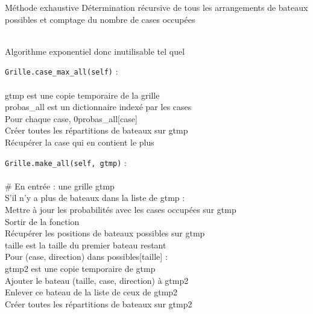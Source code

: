 \begin{frame}{Méthode exhaustive}
Détermination récursive de tous les arrangements de bateaux possibles et comptage du nombre de cases occupées \\~\\  \pause

Algorithme exponentiel donc inutilisable tel quel


\end{frame}

{
\begin{frame}[allowframebreaks]
\texttt{Grille.case\_max\_all(self)} :\\~\\

gtmp est une copie temporaire de la grille\\
probas\_all est un dictionnaire indexé par les cases\\
Pour chaque case, 0\sto probas\_all[case]\\
Créer toutes les répartitions de bateaux sur gtmp\\
Récupérer la case qui en contient le plus\\ 
\end{frame}
}

{
\begin{frame}[allowframebreaks]
\texttt{Grille.make\_all(self, gtmp)} :\\~\\

\# En entrée : une grille gtmp\\
S'il n'y a plus de bateaux dans la liste de gtmp :\\
Mettre à jour les probabilités avec les cases occupées sur gtmp\\
Sortir de la fonction\\
Récupérer les positions de bateaux possibles sur gtmp\\
taille est la taille du premier bateau restant\\
Pour (case, direction) dans possibles[taille] :\\
gtmp2 est une copie temporaire de gtmp\\
Ajouter le bateau (taille, case, direction) à gtmp2\\
Enlever ce bateau de la liste de ceux de gtmp2\\
Créer toutes les répartitions de bateaux sur gtmp2\\
\end{frame}
}

